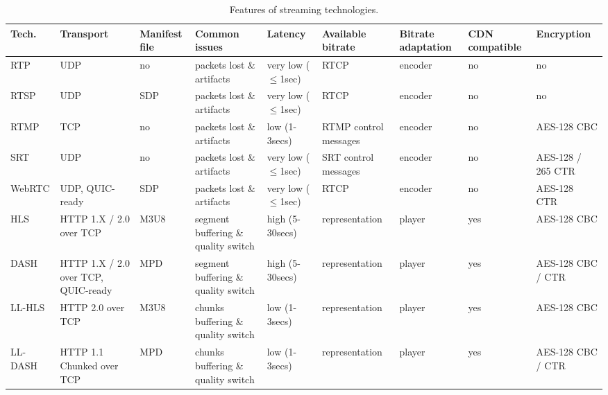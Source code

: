 \begin{table}[htp]
	\caption{Features of streaming technologies.}
	\centering
	\label{tab:IEEECOMSTalternatives}
	\def\arraystretch{1.2}%
	\setlength\tabcolsep{2.0pt} %
	{\scriptsize
		\begin{tabular}{>{\centering\arraybackslash}m{}
				>{\centering\arraybackslash}m{}
				>{\centering\arraybackslash}m{}
				>{\centering\arraybackslash}m{}
				>{\centering\arraybackslash}m{}
				>{\centering\arraybackslash}m{}
				>{\centering\arraybackslash}m{}
				>{\centering\arraybackslash}m{}
				>{\centering\arraybackslash}m{}
		}
		\toprule
		\textbf{Tech.} & \textbf{Transport} & \textbf{Manifest file} & \textbf{Common issues} & \textbf{Latency} & \textbf{Available bitrate} & \textbf{Bitrate adaptation} & \textbf{CDN compatible} & \textbf{Encryption} \\
		\midrule
		\midrule
		RTP & UDP & no & packets lost \& artifacts & very low \hbox{($\leq$1sec)} & RTCP & encoder & no & no \\
		RTSP & UDP & SDP & packets lost \& artifacts & very low \hbox{($\leq$1sec)} & RTCP & encoder & no & no \\
		RTMP & TCP & no & packets lost \& artifacts & low \hbox{(1-3secs)} & RTMP control messages & encoder & no & AES-128 CBC \\ %
		SRT & UDP & no & packets lost \& artifacts & very low \hbox{($\leq$1sec)} & SRT control messages & encoder & no & AES-128 / 265 CTR \\
		WebRTC & UDP, \hbox{QUIC-ready} & SDP & packets lost \& artifacts & very low \hbox{($\leq$1sec)} & RTCP & encoder & no & AES-128 CTR \\ %
		HLS & HTTP 1.X / 2.0 over TCP & M3U8 & segment buffering \& quality switch & high \hbox{(5-30secs)} & representation & player & yes & AES-128 CBC \\
		DASH & HTTP 1.X / 2.0 over TCP, \hbox{QUIC-ready} & MPD & segment buffering \& quality switch & high \hbox{(5-30secs)} & representation & player & yes & AES-128 CBC / CTR \\
		LL-HLS & HTTP 2.0 over TCP & M3U8 & chunks buffering \& quality switch & low \hbox{(1-3secs)} & representation & player & yes & AES-128 CBC \\
		LL-DASH & HTTP 1.1 Chunked over TCP & MPD & chunks buffering \& quality switch & low \hbox{(1-3secs)} & representation & player & yes & AES-128 CBC / CTR \\
		\bottomrule
		\bottomrule
	\end{tabular}
	}
\end{table}

